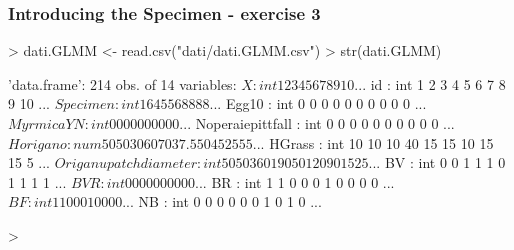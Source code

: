 \documentclass[10pt]{beamer}
\begin{document}
\begin{frame}[fragile]
\frametitle{Introducing the Specimen - exercise 3}


\begin{Schunk}
\begin{Sinput}
> dati.GLMM <- read.csv("dati/dati.GLMM.csv")
> str(dati.GLMM)
\end{Sinput}
\begin{Soutput}
'data.frame':	214 obs. of  14 variables:
 $ X                   : int  1 2 3 4 5 6 7 8 9 10 ...
 $ id                  : int  1 2 3 4 5 6 7 8 9 10 ...
 $ Specimen            : int  1 6 4 5 5 6 8 8 8 8 ...
 $ Egg10               : int  0 0 0 0 0 0 0 0 0 0 ...
 $ MyrmicaYN           : int  0 0 0 0 0 0 0 0 0 0 ...
 $ Noperaiepittfall    : int  0 0 0 0 0 0 0 0 0 0 ...
 $ Horigano            : num  50 50 30 60 70 37.5 50 45 25 55 ...
 $ HGrass              : int  10 10 10 40 15 15 10 15 15 5 ...
 $ Origanupatchdiameter: int  50 50 3 60 190 50 120 90 15 25 ...
 $ BV                  : int  0 0 1 1 1 0 1 1 1 1 ...
 $ BVR                 : int  0 0 0 0 0 0 0 0 0 0 ...
 $ BR                  : int  1 1 0 0 0 1 0 0 0 0 ...
 $ BF                  : int  1 1 0 0 0 1 0 0 0 0 ...
 $ NB                  : int  0 0 0 0 0 0 1 0 1 0 ...
\end{Soutput}
\begin{Sinput}
> 
\end{Sinput}
\end{Schunk}



\end{frame}

\end{document}

